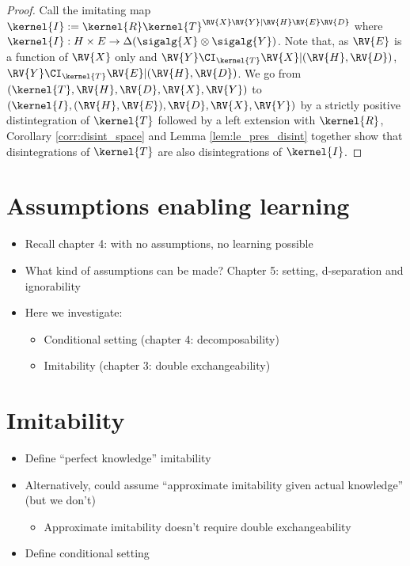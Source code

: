 \begin{proof}
Call the imitating map $\kernel{I}:=\kernel{R}\kernel{T}^{\RV{X}\RV{Y}|\RV{H}\RV{E}\RV{D}}$ where $\kernel{I}:H\times E\to \Delta(\sigalg{X}\otimes\sigalg{Y})$. Note that, as $\RV{E}$ is a function of $\RV{X}$ only and $\RV{Y}\CI_{\kernel{T}}\RV{X}|(\RV{H},\RV{D})$, $\RV{Y}\CI_{\kernel{T}} \RV{E}|(\RV{H},\RV{D})$.  We go from $(\kernel{T},\RV{H},\RV{D},\RV{X},\RV{Y})$ to $(\kernel{I},(\RV{H},\RV{E}),\RV{D},\RV{X},\RV{Y})$ by a strictly positive distintegration of $\kernel{T}$ followed by a left extension with $\kernel{R}$, Corollary \ref{corr:disint_space} and Lemma \ref{lem:le_pres_disint} together show that disintegrations of $\kernel{T}$ are also disintegrations of $\kernel{I}$.

\end{proof}

\section{Assumptions enabling learning}

\begin{itemize}
    \item Recall chapter 4: with no assumptions, no learning possible
    \item What kind of assumptions can be made? Chapter 5: setting, d-separation and ignorability
    \item Here we investigate:
    \begin{itemize}
        \item Conditional setting (chapter 4: decomposability)
        \item Imitability (chapter 3: double exchangeability)
    \end{itemize}
\end{itemize}

\section{Imitability}

\begin{itemize}
    \item Define ``perfect knowledge'' imitability
    \item Alternatively, could assume ``approximate imitability given actual knowledge'' (but we don't)
    \begin{itemize}
        \item Approximate imitability doesn't require double exchangeability
    \end{itemize}
    \item Define conditional setting
\end{itemize}

